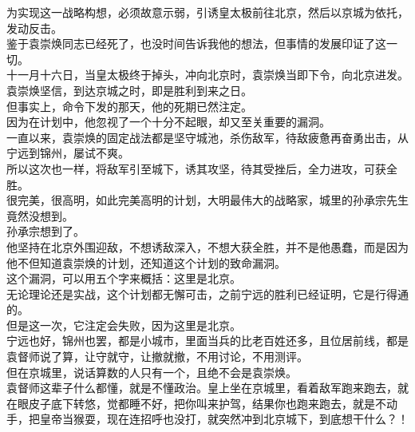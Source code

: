 \begin{multicols}{\theparacolNo}
为实现这一战略构想，必须故意示弱，引诱皇太极前往北京，然后以京城为依托，发动反击。\\

鉴于袁崇焕同志已经死了，也没时间告诉我他的想法，但事情的发展印证了这一切。\\

十一月十六日，当皇太极终于掉头，冲向北京时，袁崇焕当即下令，向北京进发。\\

袁崇焕坚信，到达京城之时，即是胜利到来之日。\\

但事实上，命令下发的那天，他的死期已然注定。\\

因为在计划中，他忽视了一个十分不起眼，却又至关重要的漏洞。\\

一直以来，袁崇焕的固定战法都是坚守城池，杀伤敌军，待敌疲惫再奋勇出击，从宁远到锦州，屡试不爽。\\

所以这次也一样，将敌军引至城下，诱其攻坚，待其受挫后，全力进攻，可获全胜。\\

很完美，很高明，如此完美高明的计划，大明最伟大的战略家，城里的孙承宗先生竟然没想到。\\

孙承宗想到了。\\

他坚持在北京外围迎敌，不想诱敌深入，不想大获全胜，并不是他愚蠢，而是因为他不但知道袁崇焕的计划，还知道这个计划的致命漏洞。\\

这个漏洞，可以用五个字来概括：这里是北京。\\

无论理论还是实战，这个计划都无懈可击，之前宁远的胜利已经证明，它是行得通的。\\

但是这一次，它注定会失败，因为这里是北京。\\

宁远也好，锦州也罢，都是小城市，里面当兵的比老百姓还多，且位居前线，都是袁督师说了算，让守就守，让撤就撤，不用讨论，不用测评。\\

但在京城里，说话算数的人只有一个，且绝不会是袁崇焕。\\

袁督师这辈子什么都懂，就是不懂政治。皇上坐在京城里，看着敌军跑来跑去，就在眼皮子底下转悠，觉都睡不好，把你叫来护驾，结果你也跑来跑去，就是不动手，把皇帝当猴耍，现在连招呼也没打，就突然冲到北京城下，到底想干什么？！\\


\end{multicols}
